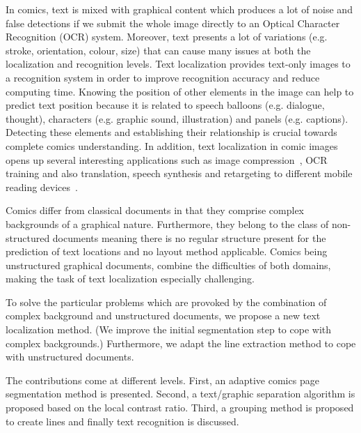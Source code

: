 In comics, text is mixed with graphical content which produces a lot of noise and false detections if we submit the whole image directly to an Optical Character Recognition (OCR) system.
Moreover, text presents a lot of variations (e.g. stroke, orientation, colour, size) that can cause many issues at both the localization and recognition levels.
Text localization provides text-only images to a recognition system in order to improve recognition accuracy and reduce computing time.
Knowing the position of other elements in the image can help to predict text position because it is related to speech balloons (e.g. dialogue, thought), characters (e.g. graphic sound, illustration) and panels (e.g. captions).
Detecting these elements and establishing their relationship is crucial towards complete comics understanding.
In addition, text localization in comic images opens up several interesting applications such as image compression~\cite{Su11}, OCR training and also translation, speech synthesis and retargeting to different mobile reading devices~\cite{Matsui2011}.

Comics differ from classical documents in that they comprise complex backgrounds of a graphical nature. Furthermore, they belong to the class of non-structured documents meaning there is no regular structure present for the prediction of text locations and no layout method applicable.
Comics being unstructured graphical documents, combine the difficulties of both domains, making the task of text localization especially challenging.

To solve the particular problems which are provoked by the combination of complex background and unstructured documents, we propose a new text localization method.
(We improve the initial segmentation step to cope with complex backgrounds.) Furthermore, we adapt the line extraction method to cope with unstructured documents.





The contributions come at different levels. First, an adaptive comics page segmentation method is presented. Second, a text/graphic separation algorithm is proposed based on the local contrast ratio. Third, a grouping method is proposed to create lines and finally text recognition is discussed.

